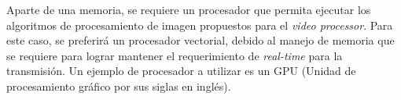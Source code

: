 \documentclass[10pt, letterpaper, conference]{IEEEtran}
\begin{document}
Aparte de una memoria, se requiere un procesador que permita ejecutar los
algoritmos de procesamiento de imagen propuestos para el 
\emph{video processor}. Para este caso, se preferir\'a un procesador 
vectorial, debido al manejo de memoria que se requiere para lograr mantener
el requerimiento de \emph{real-time} para la transmisi\'on. Un ejemplo de 
procesador a utilizar es un GPU (Unidad de procesamiento gr\'afico por sus
siglas en ingl\'es).






 

\end{document}
